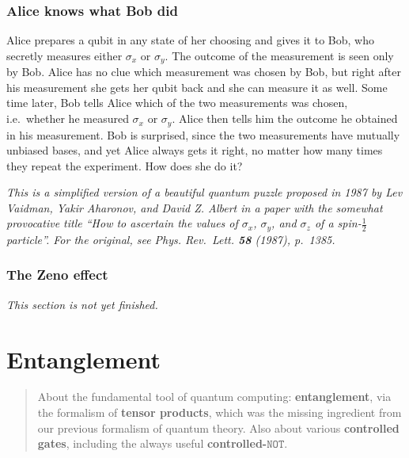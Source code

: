 \documentclass[fleqn,a4paper]{article}
\newenvironment{todo}{\color{primary}\emph{This section is not yet finished.}}{}
\let\oldsection\section
\renewcommand\section{\clearpage\oldsection}
\theoremstyle{definition}
\theoremstyle{definition}
\theoremstyle{definition}
\theoremstyle{definition}
\theoremstyle{remark}
\begin{document}
\hypertarget{alice-knows-what-bob-did}{%
\subsubsection{Alice knows what Bob did}\label{alice-knows-what-bob-did}}

Alice prepares a qubit in any state of her choosing and gives it to Bob, who secretly measures either \(\sigma_x\) or \(\sigma_y\).
The outcome of the measurement is seen only by Bob.
Alice has no clue which measurement was chosen by Bob, but right after his measurement she gets her qubit back and she can measure it as well.
Some time later, Bob tells Alice which of the two measurements was chosen, i.e.~whether he measured \(\sigma_x\) or \(\sigma_y\).
Alice then tells him the outcome he obtained in his measurement.
Bob is surprised, since the two measurements have mutually unbiased bases, and yet Alice always gets it right, no matter how many times they repeat the experiment.
How does she do it?

\emph{This is a simplified version of a beautiful quantum puzzle proposed in 1987 by Lev Vaidman, Yakir Aharonov, and David Z. Albert in a paper with the somewhat provocative title ``How to ascertain the values of \(\sigma_x\), \(\sigma_y\), and \(\sigma_z\) of a spin-\(\frac{1}{2}\) particle''. For the original, see \emph{Phys. Rev.~Lett.} \textbf{58} (1987), p.~1385.}

\hypertarget{the-zeno-effect}{%
\subsubsection{The Zeno effect}\label{the-zeno-effect}}

\begin{todo}

\end{todo}

\hypertarget{entanglement}{%
\section{Entanglement}\label{entanglement}}

\begin{quote}
About the fundamental tool of quantum computing: \textbf{entanglement}, via the formalism of \textbf{tensor products}, which was the missing ingredient from our previous formalism of quantum theory.
Also about various \textbf{controlled gates}, including the always useful \textbf{controlled-\(\texttt{NOT}\)}.
\end{quote}
\end{document}
